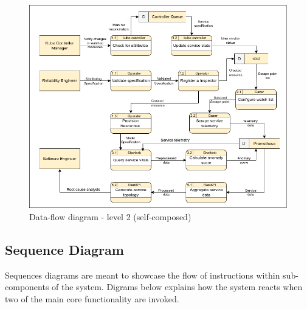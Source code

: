 \begin{figure}[H]
    \includegraphics[width=13cm]{assets/system-design/data-flow-level-2.png}
    \caption{Data-flow diagram - level 2 (self-composed)}
\end{figure}


\subsection{Sequence Diagram}

Sequences diagrams are meant to showcase the flow of instructions within sub-components of the system. Digrams below explains how the system reacts when two of the main core functionality are invoked.

